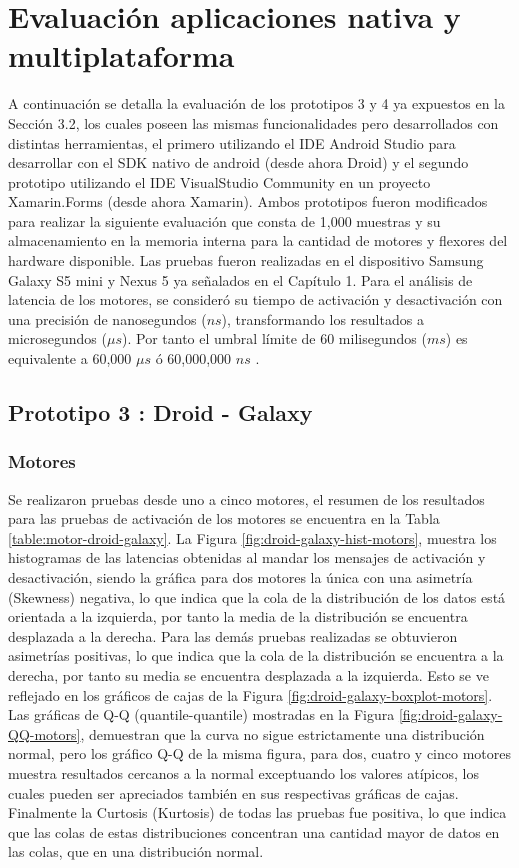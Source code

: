\section{Evaluación aplicaciones nativa y multiplataforma}
\label{section:native-vs-crossplartform}

A continuación se detalla la evaluación de los prototipos 3 y 4 ya expuestos en la Sección 3.2, los cuales poseen las mismas funcionalidades pero desarrollados con distintas herramientas, el primero utilizando el IDE Android Studio para desarrollar con el SDK nativo de android (desde ahora Droid) y el segundo prototipo utilizando el IDE VisualStudio Community en un proyecto Xamarin.Forms (desde ahora Xamarin). Ambos prototipos fueron modificados para realizar la siguiente evaluación que consta de 1,000 muestras y su almacenamiento en la memoria interna para la cantidad de motores y flexores del hardware disponible. Las pruebas fueron realizadas en el dispositivo Samsung Galaxy S5 mini y Nexus 5 ya señalados en el Capítulo 1. Para el análisis de latencia de los motores, se consideró su tiempo de activación y desactivación con una precisión de nanosegundos ($ns$), transformando los resultados a microsegundos ($\mu s$).  Por tanto el umbral límite de 60 milisegundos ($ms$) es equivalente a 60,000 $\mu s$ ó 60,000,000 $ns$ .

\subsection{Prototipo 3 : Droid - Galaxy}

\subsubsection{Motores}

Se realizaron pruebas desde uno a cinco motores, el resumen de los resultados para las pruebas de activación de los motores se encuentra en la Tabla \ref{table:motor-droid-galaxy}. La Figura \ref{fig:droid-galaxy-hist-motors}, muestra los histogramas de las latencias obtenidas al mandar los mensajes de activación y desactivación, siendo la gráfica para dos motores la única con una asimetría (Skewness) negativa, lo que indica que la cola de la distribución de los datos está orientada a la izquierda, por tanto la media de la distribución se encuentra desplazada a la derecha. Para las demás pruebas realizadas se obtuvieron asimetrías positivas, lo que indica que la cola de la distribución se encuentra a la derecha, por tanto su media se encuentra desplazada a la izquierda. Esto se ve reflejado en los gráficos de cajas de la Figura \ref{fig:droid-galaxy-boxplot-motors}. Las gráficas de Q-Q (quantile-quantile) mostradas en la Figura \ref{fig:droid-galaxy-QQ-motors}, demuestran que la curva no sigue estrictamente una distribución normal, pero los gráfico Q-Q de la misma figura, para dos, cuatro y cinco motores muestra resultados cercanos a la normal exceptuando los valores atípicos, los cuales pueden ser apreciados también en sus respectivas gráficas de cajas. Finalmente la Curtosis (Kurtosis) de todas las pruebas fue positiva, lo que indica que las colas de estas distribuciones concentran una cantidad mayor de datos en las colas, que en una distribución normal.

